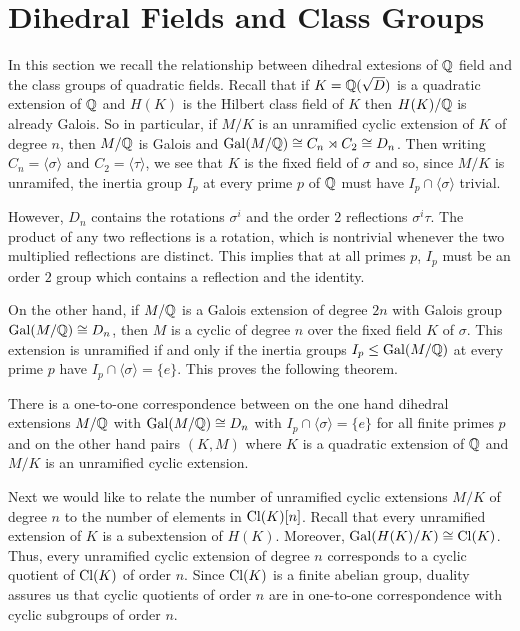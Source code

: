 \section{Dihedral Fields and Class Groups}\label{sec:classgroups}

In this section we recall the relationship between dihedral extesions of $\mathbb{Q}$
field and the class groups of quadratic fields. Recall that if $K = \mathbb{Q}(\sqrt{D})$ is a
quadratic extension of $\mathbb{Q}$ and $H(K)$ is the Hilbert class field of $K$ then
$H(K)/\mathbb{Q}$ is already Galois. So in particular, if $M/K$ is an unramified cyclic
extension of $K$ of degree $n$, then $M/\mathbb{Q}$ is Galois and $\operatorname{Gal}(M/\mathbb{Q}) \cong C_n
\rtimes C_2 \cong D_n$.  Then writing $C_n = \langle \sigma \rangle$ and $C_2 =
\langle \tau \rangle$, we see that $K$ is the fixed field of $\sigma$ and so,
since $M/K$ is unramifed, the inertia group $I_p$ at every prime $p$ of $\mathbb{Q}$
must have $I_p \cap \langle \sigma \rangle$ trivial.

However, $D_n$ contains the rotations $\sigma^i$ and the order $2$ reflections
$\sigma^i\tau$.  The product of any two reflections is a rotation, which is
nontrivial whenever the two multiplied reflections are distinct. This implies
that at all primes $p$, $I_p$ must be an order $2$ group which contains a
reflection and the identity.

On the other hand, if $M/\mathbb{Q}$ is a Galois extension of degree $2n$ with Galois
group $\operatorname{Gal}(M/\mathbb{Q}) \cong D_n$, then $M$ is a cyclic of degree $n$ over the fixed
field $K$ of $\sigma$.  This extension is unramified if and only if the inertia
groups $I_p \leq \operatorname{Gal}(M/\mathbb{Q})$ at every prime $p$ have $I_p \cap \langle \sigma
\rangle = \{ e \}$. This proves the following theorem.

\begin{prop}\label{prop:nottoram}
  There is a one-to-one correspondence between on the one hand dihedral
extensions $M/\mathbb{Q}$ with $\operatorname{Gal}(M/\mathbb{Q}) \cong D_n$ with $I_p \cap \langle \sigma
\rangle = \{ e \}$ for all finite primes $p$ and on the other hand pairs $(K,
M)$ where $K$ is a quadratic extension of $\mathbb{Q}$ and $M/K$ is an unramified
cyclic extension.
\end{prop}

Next we would like to relate the number of unramified cyclic extensions $M/K$
of degree $n$ to the number of elements in $\operatorname{Cl}(K)[n]$. Recall that every
unramified extension of $K$ is a subextension of $H(K)$. Moreover,
$\operatorname{Gal}(H(K)/K) \cong \operatorname{Cl}(K)$. Thus, every unramified cyclic extension of degree
$n$ corresponds to a cyclic quotient of $\operatorname{Cl}(K)$ of order $n$. Since $\operatorname{Cl}(K)$
is a finite abelian group, duality assures us that cyclic quotients of order
$n$ are in one-to-one correspondence with cyclic subgroups of order $n$.

